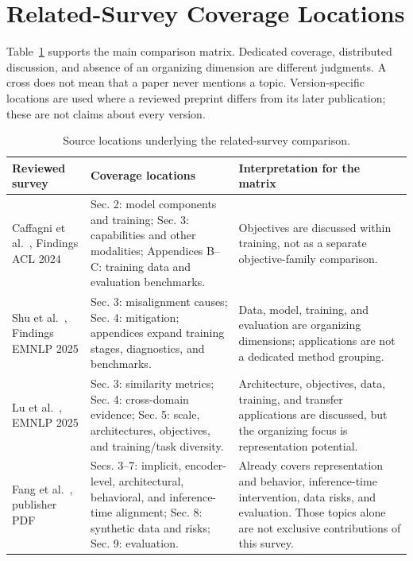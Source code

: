 \documentclass[10pt,onecolumn,journal,compsoc]{IEEEtran}
\begin{document}
\section{Related-Survey Coverage Locations}
Table~\ref{tab:supp-surveys} supports the main comparison matrix. Dedicated coverage, distributed discussion, and absence of an organizing dimension are different judgments. A cross does not mean that a paper never mentions a topic. Version-specific locations are used where a reviewed preprint differs from its later publication; these are not claims about every version.
\begin{table}[H]
\caption{Source locations underlying the related-survey comparison.}
\label{tab:supp-surveys}
\centering\small
\setlength{\tabcolsep}{5pt}\renewcommand{\arraystretch}{1.22}
\begin{tabularx}{\textwidth}{>{\raggedright\arraybackslash}p{}XX}
\toprule\rowcolor{surveyheader}
\textbf{Reviewed survey} & \textbf{Coverage locations} & \textbf{Interpretation for the matrix}\\\midrule
Caffagni et al.~\cite{caffagni2024revolution}, Findings ACL 2024 & Sec. 2: model components and training; Sec. 3: capabilities and other modalities; Appendices B--C: training data and evaluation benchmarks. & Objectives are discussed within training, not as a separate objective-family comparison.\\
Shu et al.~\cite{shu2025alignmentexplainability}, Findings EMNLP 2025 & Sec. 3: misalignment causes; Sec. 4: mitigation; appendices expand training stages, diagnostics, and benchmarks. & Data, model, training, and evaluation are organizing dimensions; applications are not a dedicated method grouping.\\
Lu et al.~\cite{lu2025representationpotentials}, EMNLP 2025 & Sec. 3: similarity metrics; Sec. 4: cross-domain evidence; Sec. 5: scale, architectures, objectives, and training/task diversity. & Architecture, objectives, data, training, and transfer applications are discussed, but the organizing focus is representation potential.\\
Fang et al.~\cite{fang2026alignmentsurvey}, publisher PDF & Secs. 3--7: implicit, encoder-level, architectural, behavioral, and inference-time alignment; Sec. 8: synthetic data and risks; Sec. 9: evaluation. & Already covers representation and behavior, inference-time intervention, data risks, and evaluation. Those topics alone are not exclusive contributions of this survey.\\

\end{tabularx}
\end{table}
\end{document}
